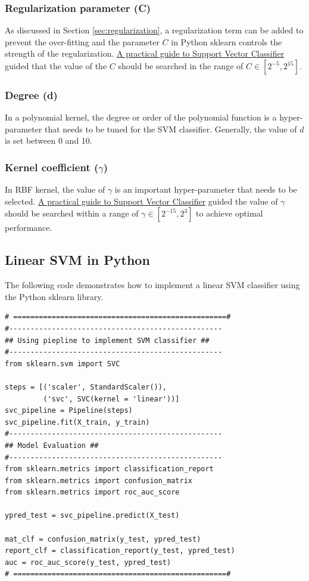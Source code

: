 \subsubsection{\textbf{Regularization parameter (C)}}
As discussed in Section \ref{sec:regularization}, a regularization term can be added to prevent the over-fitting and the parameter $C$ in Python sklearn controls the strength of the regularization. \href{https://www.csie.ntu.edu.tw/~cjlin/papers/guide/guide.pdf}{A practical guide to Support Vector Classifier} \cite{svmGuide:1984} guided that the value of the $C$ should be searched in the range of $C \in [2^{-5}, 2^15]$.

\subsubsection{\textbf{Degree (d)}}
In a polynomial kernel, the degree or order of the polynomial function is a hyper-parameter that needs to be tuned for the SVM classifier. Generally, the value of $d$ is set between 0 and 10.

\subsubsection{\textbf{Kernel coefficient ($\gamma$)}}
In RBF kernel, the value of $\gamma$ is an important hyper-parameter that needs to be selected. \href{https://www.csie.ntu.edu.tw/~cjlin/papers/guide/guide.pdf}{A practical guide to Support Vector Classifier} \cite{svmGuide:1984} guided the value of $\gamma$ should be searched within a range of $\gamma \in [2^{-15}, 2^3]$ to achieve optimal performance.

\newpage
\subsection{Linear SVM in Python}
The following code demonstrates how to implement a linear SVM classifier using the Python sklearn library.

\begin{lstlisting}
# ==================================================#
#--------------------------------------------------
## Using piepline to implement SVM classifier ##
#--------------------------------------------------
from sklearn.svm import SVC

steps = [('scaler', StandardScaler()),
         ('svc', SVC(kernel = 'linear'))]
svc_pipeline = Pipeline(steps)
svc_pipeline.fit(X_train, y_train)
#--------------------------------------------------
## Model Evaluation ##
#--------------------------------------------------
from sklearn.metrics import classification_report
from sklearn.metrics import confusion_matrix
from sklearn.metrics import roc_auc_score

ypred_test = svc_pipeline.predict(X_test)

mat_clf = confusion_matrix(y_test, ypred_test)
report_clf = classification_report(y_test, ypred_test)
auc = roc_auc_score(y_test, ypred_test)
# ==================================================#
\end{lstlisting}


